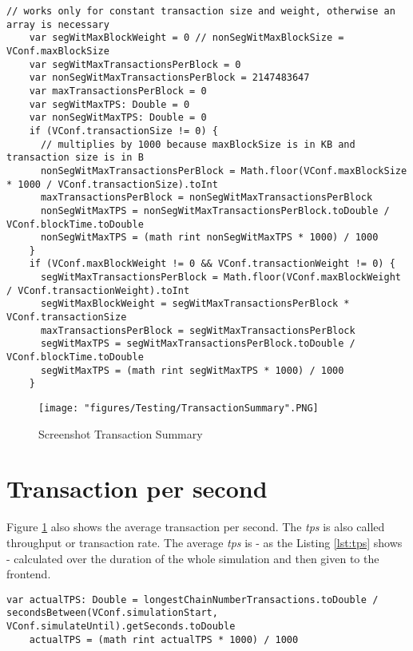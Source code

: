 \begin{minipage}{\linewidth}
\begin{lstlisting}[style=myScalastyle,label=lst:blockweightlimitCalculations,
caption={Calculations for the comparisons in the ReducerActor}]
// works only for constant transaction size and weight, otherwise an array is necessary
    var segWitMaxBlockWeight = 0 // nonSegWitMaxBlockSize = VConf.maxBlockSize
    var segWitMaxTransactionsPerBlock = 0
    var nonSegWitMaxTransactionsPerBlock = 2147483647
    var maxTransactionsPerBlock = 0
    var segWitMaxTPS: Double = 0
    var nonSegWitMaxTPS: Double = 0
    if (VConf.transactionSize != 0) {
      // multiplies by 1000 because maxBlockSize is in KB and transaction size is in B
      nonSegWitMaxTransactionsPerBlock = Math.floor(VConf.maxBlockSize * 1000 / VConf.transactionSize).toInt
      maxTransactionsPerBlock = nonSegWitMaxTransactionsPerBlock
      nonSegWitMaxTPS = nonSegWitMaxTransactionsPerBlock.toDouble / VConf.blockTime.toDouble
      nonSegWitMaxTPS = (math rint nonSegWitMaxTPS * 1000) / 1000
    }
    if (VConf.maxBlockWeight != 0 && VConf.transactionWeight != 0) {
      segWitMaxTransactionsPerBlock = Math.floor(VConf.maxBlockWeight / VConf.transactionWeight).toInt
      segWitMaxBlockWeight = segWitMaxTransactionsPerBlock * VConf.transactionSize
      maxTransactionsPerBlock = segWitMaxTransactionsPerBlock
      segWitMaxTPS = segWitMaxTransactionsPerBlock.toDouble / VConf.blockTime.toDouble
      segWitMaxTPS = (math rint segWitMaxTPS * 1000) / 1000
    }
\end{lstlisting}
\end{minipage}

\begin{figure}
\centering
\texttt{[image: "figures/Testing/TransactionSummary".PNG]}
\caption{Screenshot Transaction Summary\label{fig:TransactionSummary}}
\end{figure}

\section{Transaction per second}

Figure \ref{fig:TransactionSummary} also shows the average transaction per second. The \textit{tps} is also called throughput or transaction rate. The average \textit{tps} is - as the Listing \ref{lst:tps} shows - calculated over the duration of the whole simulation and then given to the frontend.

\begin{minipage}{\linewidth}
\begin{lstlisting}[style=myScalastyle,label=lst:tps,
caption={Calculations for the tps in the ReducerActor}]
    var actualTPS: Double = longestChainNumberTransactions.toDouble / secondsBetween(VConf.simulationStart, VConf.simulateUntil).getSeconds.toDouble
    actualTPS = (math rint actualTPS * 1000) / 1000
\end{lstlisting}
\end{minipage}

